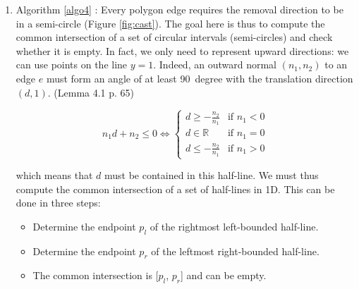 \documentclass[11pt]{article}
\begin{document}
\begin{enumerate}
    \item Algorithm \ref{algo4} \cite{l5}: Every polygon edge requires the removal direction to be in a semi-circle (Figure \ref{fig:cast}). The goal here is thus to compute the common intersection of a set of circular intervals (semi-circles) and check whether it is empty. In fact, we only need to represent upward directions:  we can use points on the line $y=1$.  Indeed, an outward normal $(n_1,n_2)$ to an edge $e$ must form an angle of at least  \SI{90}{degree} with the translation direction $(d,1)$. (Lemma 4.1 p. 65)
    
    $$ n_1 d+n_2\leq 0 \Leftrightarrow \begin{cases}d\geq -\frac{n_2}{n_1} & \text{if } n_1<0 \\ d \in \mathbb{R} & \text{if } n_1=0 \\d\leq -\frac{n_2}{n_1} & \text{if } n_1>0 \end{cases}$$
    
    which means that $d$ must be contained in this half-line. We must thus compute the common intersection of a set of half-lines in 1D. This can be done in three steps:
    \begin{itemize}
        \item Determine the endpoint $p_l$ of the rightmost left-bounded half-line.
        \item Determine the endpoint $p_r$ of the leftmost right-bounded half-line.
        \item The common intersection is [$p_l$, $p_r$] and can be empty.
    \end{itemize}
    

\end{enumerate}
\end{document}
